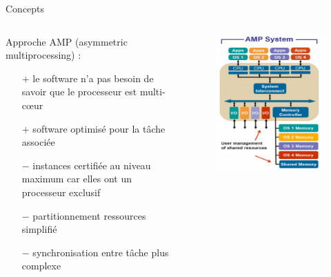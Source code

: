 \documentclass{beamer}
\begin{document}
\begin{frame}{Concepts}
	\begin{columns}
		\begingroup
		\small
		\hspace{0.3cm}
		\begin{column}{0.55\paperwidth}
			Approche AMP (asymmetric multi\-processing) :
				\begin{itemize}
					\item[$+$] le software n'a pas besoin de savoir que le processeur est
						multi-cœur
					\item[$+$] software optimisé pour la tâche associée
					\item[$-$] instances certifiée au niveau maximum car elles ont un
						processeur exclusif 
					\item[$-$] partitionnement ressources simplifié
					\item[$-$] synchronisation entre tâche plus complexe
				\end{itemize}
		\end{column}
		\endgroup
		\begin{column}{0.45\paperwidth}
			\begin{figure}
				\centering
				\includegraphics[width=0.7\linewidth]{amp.png}
			\end{figure}	
		\end{column}
	\end{columns}
\end{frame}
\end{document}
